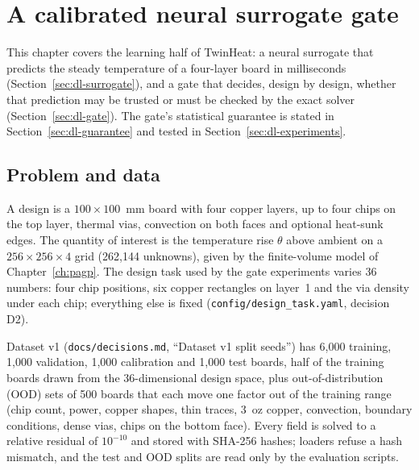 
\chapter{A calibrated neural surrogate gate}
\label{ch:dl}

This chapter covers the learning half of TwinHeat: a neural surrogate that predicts the steady
temperature of a four-layer board in milliseconds (Section~\ref{sec:dl-surrogate}), and a gate
that decides, design by design, whether that prediction may be trusted or must be checked by the
exact solver (Section~\ref{sec:dl-gate}). The gate's statistical guarantee is stated in
Section~\ref{sec:dl-guarantee} and tested in Section~\ref{sec:dl-experiments}.

\section{Problem and data}
\label{sec:dl-data}
A design is a $100\times100$~mm board with four copper layers, up to four chips on the top
layer, thermal vias, convection on both faces and optional heat-sunk edges. The quantity of
interest is the temperature rise $\theta$ above ambient on a $256\times256\times4$ grid
(262{,}144 unknowns), given by the finite-volume model of Chapter~\ref{ch:pagp}. The design
task used by the gate experiments varies 36 numbers: four chip positions, six copper rectangles
on layer~1 and the via density under each chip; everything else is fixed
(\texttt{config/design\_task.yaml}, decision D2).

Dataset v1 (\texttt{docs/decisions.md}, ``Dataset v1 split seeds'') has 6{,}000 training,
1{,}000 validation, 1{,}000 calibration and 1{,}000 test boards, half of the training boards
drawn from the 36-dimensional design space, plus out-of-distribution (OOD) sets of 500 boards
that each move one factor out of the training range (chip count, power, copper shapes, thin
traces, 3~oz copper, convection, boundary conditions, dense vias, chips on the bottom face).
Every field is solved to a relative residual of $10^{-10}$ and stored with SHA-256 hashes;
loaders refuse a hash mismatch, and the test and OOD splits are read only by the evaluation
scripts.

